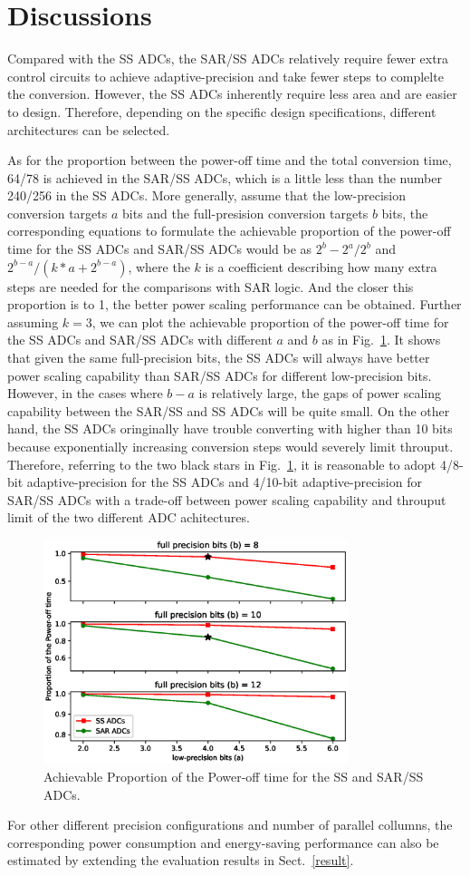 \section{Discussions}\label{discussion}

Compared with the SS ADCs, the SAR/SS ADCs relatively require fewer extra control circuits to achieve adaptive-precision and take fewer steps to complelte the conversion. However, the SS ADCs inherently require less area and are easier to design. Therefore, depending on the specific design specifications, different architectures can be selected. 

As for the proportion between the power-off time and the total conversion time, 64/78 is achieved in the SAR/SS ADCs, which is a little less than the number 240/256 in the SS ADCs. More generally, assume that the low-precision conversion targets $a$ bits and the full-presision conversion targets $b$ bits, the corresponding equations to formulate the achievable proportion of the power-off time for the SS ADCs and SAR/SS ADCs would be as $2^b-2^a/2^b$ and $2^{b-a}/(k*a+2^{b-a})$, where the $k$ is a coefficient describing how many extra steps are needed for the comparisons with SAR logic.
And the closer this proportion is to 1, the better power scaling performance can be obtained.
Further assuming $k=3$, we can plot the achievable proportion of the power-off time for the SS ADCs and SAR/SS ADCs with different $a$ and $b$ as in Fig.~\ref{Proportion}. 
It shows that given the same full-precision bits, the SS ADCs will always have better power scaling capability than SAR/SS ADCs for different low-precision bits. However, in the cases where $b-a$ is relatively large, the gaps of power scaling capability between the SAR/SS and SS ADCs will be quite small. On the other hand, the SS ADCs oringinally have trouble converting with higher than 10 bits because exponentially increasing conversion steps would severely limit throuput. 
Therefore, referring to the two black stars in Fig.~\ref{Proportion}, it is reasonable to adopt 4/8-bit adaptive-precision for the SS ADCs and 4/10-bit adaptive-precision for SAR/SS ADCs with a trade-off between power scaling capability and throuput limit of the two different ADC achitectures.

\begin{figure}[htbp]
	\centerline{\includegraphics[width=3.5in]{./Figures/Proportion.eps}}
	\caption{Achievable Proportion of the Power-off time for the SS and SAR/SS ADCs.}
	\label{Proportion}
\end{figure} 

For other different precision configurations and number of parallel collumns, 
the corresponding power consumption and energy-saving performance can also be estimated by extending the evaluation results in Sect.~\ref{result}.